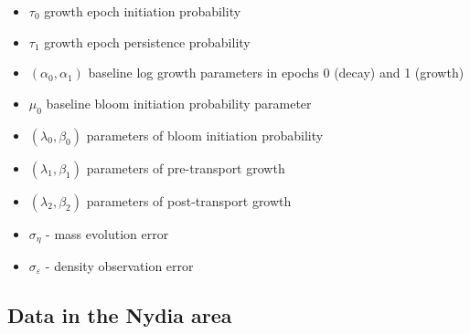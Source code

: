 \documentclass[
]{article}
\providecommand{\tightlist}{%
  \setlength{\itemsep}{0pt}\setlength{\parskip}{0pt}}
\begin{document}
\begin{itemize}
\tightlist
\item
  \(\tau_0\) growth epoch initiation probability
\item
  \(\tau_1\) growth epoch persistence probability
\item
  \((\alpha_0, \alpha_1)\) baseline log growth parameters in epochs 0
  (decay) and 1 (growth)
\item
  \(\mu_0\) baseline bloom initiation probability parameter
\item
  \((\lambda_0,\beta_0)\) parameters of bloom initiation probability
\item
  \((\lambda_1,\beta_1)\) parameters of pre-transport growth
\item
  \((\lambda_2,\beta_2)\) parameters of post-transport growth
\item
  \(\sigma_\eta\) - mass evolution error
\item
  \(\sigma_\varepsilon\) - density observation error
\end{itemize}

\hypertarget{data-in-the-nydia-area}{%
\subsection{Data in the Nydia area}\label{data-in-the-nydia-area}}
\end{document}
